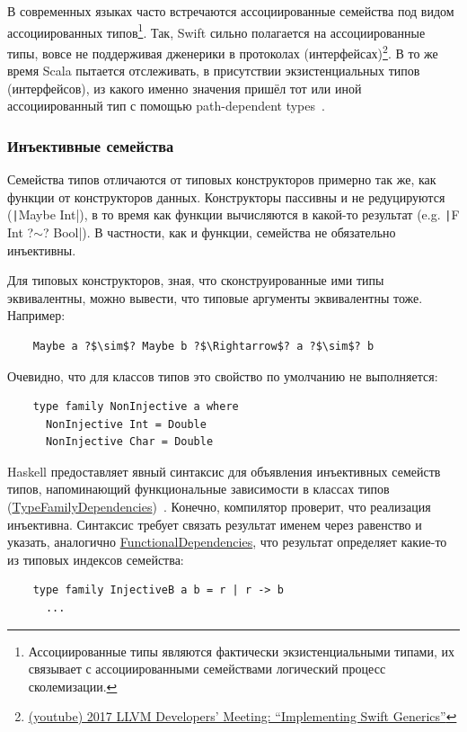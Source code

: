 В современных языках часто встречаются ассоциированные семейства под видом ассоциированных типов\footnote{Ассоциированные типы являются фактически экзистенциальными типами, их связывает с ассоциированными семействами логический процесс сколемизации.}.
Так, Swift сильно полагается на ассоциированные типы, вовсе не поддерживая дженерики в протоколах (интерфейсах)\footnote{\href{https://youtu.be/ctS8FzqcRug?si=y_ZYnuUOulA33d_X}{(youtube) 2017 LLVM Developers’ Meeting: ``Implementing Swift Generics''}}.
В то же время Scala пытается отслеживать, в присутствии экзистенциальных типов (интерфейсов), из какого именно значения пришёл тот или иной ассоциированный тип с помощью path-dependent types~\cite{amin2014foundations}.

\subsubsection{Инъективные семейства}

Семейства типов отличаются от типовых конструкторов примерно так же, как функции от конструкторов данных.
Конструкторы пассивны и не редуцируются (\texttt|Maybe Int|), в то время как функции вычисляются в какой-то результат (e.g. \texttt|F Int ?$\sim$? Bool|).
В частности, как и функции, семейства не обязательно инъективны.

Для типовых конструкторов, зная, что сконструированные ими типы эквивалентны, можно вывести, что типовые аргументы эквивалентны тоже.
Например:
\begin{verbatim}
    Maybe a ?$\sim$? Maybe b ?$\Rightarrow$? a ?$\sim$? b
\end{verbatim}

Очевидно, что для классов типов это свойство по умолчанию не выполняется:
\begin{verbatim}
    type family NonInjective a where
      NonInjective Int = Double
      NonInjective Char = Double
\end{verbatim}

Haskell предоставляет явный синтаксис для объявления инъективных семейств типов, напоминающий функциональные зависимости в классах типов (\href{https://ghc.gitlab.haskell.org/ghc/doc/users_guide/exts/type_families.html#extension-TypeFamilyDependencies}{TypeFamilyDependencies})~\cite{stolarek2015injective}.
Конечно, компилятор проверит, что реализация инъективна.
Синтаксис требует связать результат именем через равенство и указать, аналогично \href{https://ghc.gitlab.haskell.org/ghc/doc/users_guide/exts/functional_dependencies.html}{FunctionalDependencies}, что результат определяет какие-то из типовых индексов семейства:
\begin{verbatim}
    type family InjectiveB a b = r | r -> b
      ...
\end{verbatim}

